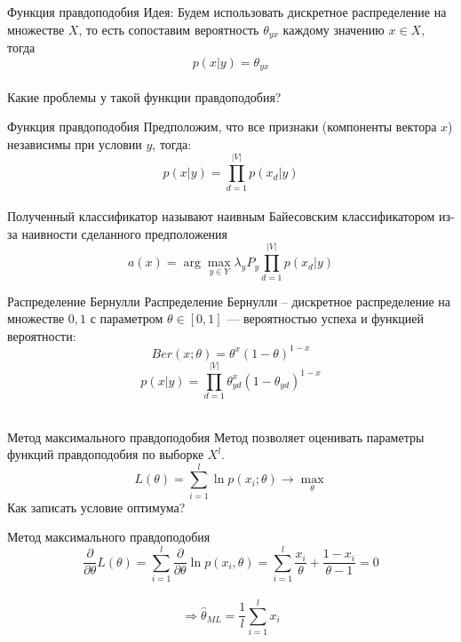 \documentclass[10pt]{beamer}
\begin{document}
\begin{frame} {Функция правдоподобия}
  \alert{Идея}: Будем использовать дискретное распределение на множестве $X$, то есть сопоставим вероятность $\theta_{yx}$ каждому значению $x \in X$, тогда\\
  $$p(x|y) = \theta_{yx}$$\\
  \bigbreak
  \pause
  Какие проблемы у такой функции правдоподобия?
\end{frame}

\begin{frame} {Функция правдоподобия}
  Предположим, что все признаки (компоненты вектора $x$) независимы \alert{при условии} $y$, тогда:\\
  $$p(x|y) = \prod\limits_{d=1}^{|V|} p(x_d | y)$$\\
  \pause
  \bigbreak
  Полученный классификатор называют \alert{наивным} Байесовским классификатором из-за наивности сделанного предположения\\
  $$a(x) = \arg\max_{y \in Y} \lambda_y P_y \prod\limits_{d=1}^{|V|} p(x_d | y)$$
\end{frame}

{
\begin{frame} {Распределение Бернулли}
  Распределение Бернулли -- дискретное распределение на множестве ${0, 1}$ с параметром $\theta \in [0, 1]$ — вероятностью \alert{успеха} и функцией вероятности:\\
  $$Ber(x; \theta) = \theta^x (1 - \theta)^{1-x}$$
  \bigbreak
  \pause
  $$p(x|y) = \prod\limits_{d=1}^{|V|} \theta_{yd}^x (1 - \theta_{yd})^{1-x}$$\\

\end{frame}
}

\begin{frame}{Метод максимального правдоподобия}
  Метод позволяет оценивать параметры функций правдоподобия по выборке $X^l$.\\
  $$L(\theta) = \sum\limits_{i=1}^{l} \ln p(x_i;\theta) \rightarrow \max\limits_{\theta}$$
  Как записать условие оптимума?
\end{frame}

\begin{frame}{Метод максимального правдоподобия}
  $$\frac{\partial }{\partial \theta} L(\theta) = \sum\limits_{i=1}^{l} \frac{\partial }{\partial \theta} \ln p(x_i, \theta) = \sum\limits_{i=1}^{l} \frac{x_i}{\theta} + \frac{1-x_i}{\theta-1} = 0$$\\
  \pause
  $$\Rightarrow \hat{\theta}_{ML} = \frac{1}{l} \sum\limits_{i=1}^{l} x_i$$
\end{frame}
\end{document}
